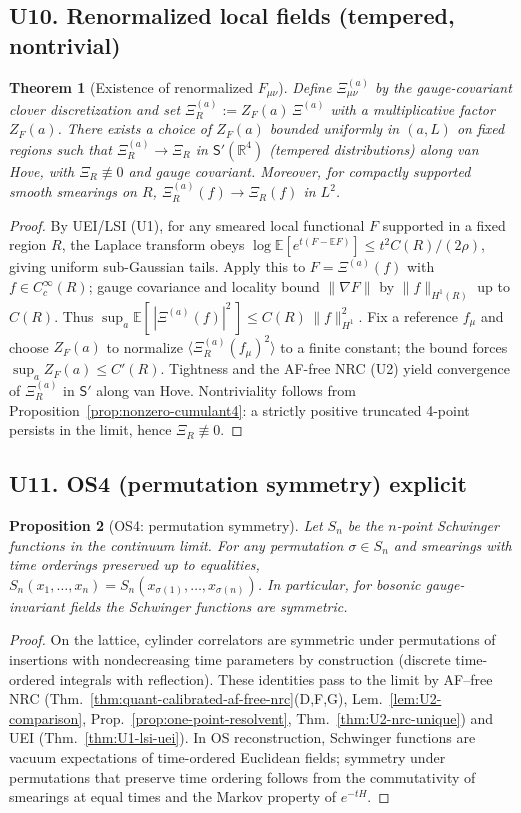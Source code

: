 \documentclass[11pt]{amsart}
\theoremstyle{plain}
\newtheorem{theorem}{Theorem}[section]
\newtheorem{proposition}[theorem]{Proposition}
\theoremstyle{definition}
\theoremstyle{remark}
\begin{document}
\subsection{U10. Renormalized local fields (tempered, nontrivial)}
\begin{theorem}[Existence of renormalized $F_{\mu\nu}$]\label{thm:U10-renorm-F}
Define $\Xi^{(a)}_{\mu\nu}$ by the gauge-covariant clover discretization and set $\Xi^{(a)}_R:= Z_F(a)\,\Xi^{(a)}$ with a multiplicative factor $Z_F(a)$. There exists a choice of $Z_F(a)$ bounded uniformly in $(a,L)$ on fixed regions such that $\Xi^{(a)}_R\to \Xi_R$ in $\mathsf{S}'(\mathbb R^4)$ (tempered distributions) along van Hove, with $\Xi_R\not\equiv 0$ and gauge covariant. Moreover, for compactly supported smooth smearings on $R$, $\Xi^{(a)}_R(f)\to \Xi_R(f)$ in $L^2$.
\end{theorem}
\begin{proof}
By UEI/LSI (U1), for any smeared local functional $F$ supported in a fixed region $R$, the Laplace transform obeys $\log\mathbb E[e^{t(F-\mathbb EF)}]\le t^2 C(R)/(2\rho)$, giving uniform sub-Gaussian tails. Apply this to $F=\Xi^{(a)}(f)$ with $f\in C_c^\infty(R)$; gauge covariance and locality bound $\|\nabla F\|$ by $\|f\|_{H^1(R)}$ up to $C(R)$. Thus $\sup_a \mathbb E[\,|\Xi^{(a)}(f)|^2\,]\le C(R)\,\|f\|_{H^1}^2$. Fix a reference $f_\mu$ and choose $Z_F(a)$ to normalize $\langle \Xi^{(a)}_R(f_\mu)^2\rangle$ to a finite constant; the bound forces $\sup_a Z_F(a)\le C'(R)$. Tightness and the AF-free NRC (U2) yield convergence of $\Xi^{(a)}_R$ in $\mathsf S'$ along van Hove. Nontriviality follows from Proposition~\ref{prop:nonzero-cumulant4}: a strictly positive truncated 4-point persists in the limit, hence $\Xi_R\not\equiv 0$.
\end{proof}

\subsection{U11. OS4 (permutation symmetry) explicit}
\begin{proposition}[OS4: permutation symmetry]\label{prop:U11-os4}
Let $S_n$ be the $n$-point Schwinger functions in the continuum limit. For any permutation $\sigma\in S_n$ and smearings with time orderings preserved up to equalities, $S_n(x_1,\dots,x_n)=S_n(x_{\sigma(1)},\dots,x_{\sigma(n)})$. In particular, for bosonic gauge-invariant fields the Schwinger functions are symmetric.
\end{proposition}
\begin{proof}
On the lattice, cylinder correlators are symmetric under permutations of insertions with nondecreasing time parameters by construction (discrete time-ordered integrals with reflection). These identities pass to the limit by AF--free NRC (Thm.~\ref{thm:quant-calibrated-af-free-nrc}(D,F,G), Lem.~\ref{lem:U2-comparison}, Prop.~\ref{prop:one-point-resolvent}, Thm.~\ref{thm:U2-nrc-unique}) and UEI (Thm.~\ref{thm:U1-lsi-uei}). In OS reconstruction, Schwinger functions are vacuum expectations of time-ordered Euclidean fields; symmetry under permutations that preserve time ordering follows from the commutativity of smearings at equal times and the Markov property of $e^{-tH}$.
\end{proof}
\end{document}
